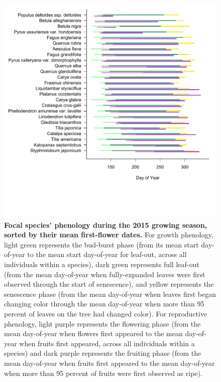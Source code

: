 \documentclass{article}
\begin{document}
\begin{figure}[h]
  \centering
  \includegraphics{../analyses/figures/grosea_repsort.pdf}
  \caption{\textbf{Focal species' phenology during the 2015 growing season, sorted by their mean first-flower dates.} For growth phenology, light green represents the bud-burst phase (from its mean start day-of-year to the mean start day-of-year for leaf-out, across all individuals within a species), dark green represents full leaf-out (from the mean day-of-year when fully-expanded leaves were first observed through the start of senescence), and yellow represents the senescence phase (from the mean day-of-year when leaves first began changing color through the mean day-of-year when more than 95 percent of leaves on the tree had changed color). For reproductive phenology, light purple represents the flowering phase (from the mean day-of-year when flowers first appeared to the mean day-of-year when fruits first appeared, across all individuals within a species) and dark purple represents the fruiting phase (from the mean day-of-year when fruits first appeared to the mean day-of-year when more than 95 percent of fruits were first observed as ripe).}
  \label{fig:focsp}
\end{figure}
  
\end{document}
